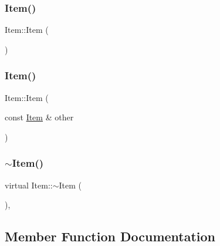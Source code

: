 \mbox{\label{class_item_a297720c02984eab37332ae795d22189d}} 
\subsubsection{\texorpdfstring{Item()}{Item()}\hspace{0.1cm}{\footnotesize\ttfamily [4/5]}}
{\footnotesize\ttfamily Item\+::\+Item (\begin{DoxyParamCaption}{ }\end{DoxyParamCaption})}

\mbox{\label{class_item_a44f7e3f580bd6c0fa2e1c288dff484be}} 
\subsubsection{\texorpdfstring{Item()}{Item()}\hspace{0.1cm}{\footnotesize\ttfamily [5/5]}}
{\footnotesize\ttfamily Item\+::\+Item (\begin{DoxyParamCaption}\item[{const \mbox{\hyperlink{class_item}{Item}} \&}]{other }\end{DoxyParamCaption})}

\mbox{\label{class_item_a33cc9c0bc556b5a33a9d0d58d37c602b}} 
\subsubsection{\texorpdfstring{$\sim$\+Item()}{~Item()}}
{\footnotesize\ttfamily virtual Item\+::$\sim$\+Item (\begin{DoxyParamCaption}{ }\end{DoxyParamCaption})\hspace{0.3cm}{\ttfamily [inline]}, {\ttfamily [virtual]}}



\subsection{Member Function Documentation}
\mbox{\label{class_item_a6c9f73ef36b176cdb75bc9b13d5be8e8}} 
